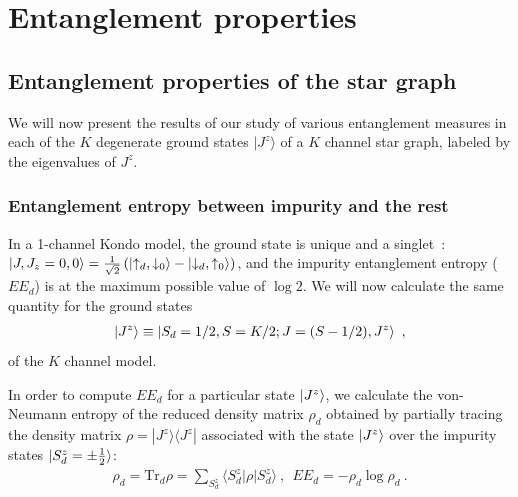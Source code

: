 \documentclass{iopart}
\begin{document}
\section{Entanglement properties}
\label{sec:ent_prop}

\subsection{Entanglement properties of the star graph}
\label{sec:EE_star graph}

We will now present the results of our study of various entanglement measures in each of the $K$ degenerate ground states $|J^z\rangle$ of a $K$ channel star graph, labeled by the eigenvalues of $J^z$.
\subsubsection{Entanglement entropy between impurity and the rest}
In a 1-channel Kondo model, the ground state is unique and a singlet~\cite{wilson1975renormalization}: \(\ket{J,J_z=0,0} = \frac{1}{\sqrt{2}} \left(\ket{\uparrow_{d},\downarrow_0} - \ket{\downarrow_d, \uparrow_0}\right)\), and the impurity entanglement entropy ($EE_d$) is at the  maximum possible value of $\log 2$.
We will now calculate the same quantity for the ground states 
\begin{eqnarray}
\ket{J^z} \equiv \ket{S_d=1/2,S=K/2;J=(S-1/2),J^z}~,
\end{eqnarray}
of the $K$ channel model.

In order to compute \(EE_d\) for a particular state \(\ket{J^z}\), we calculate the von-Neumann entropy of the reduced density matrix \(\rho_d\) obtained by partially tracing the density matrix $\rho=|J^z\rangle\langle J^z|$ associated with the state \(\ket{J^z}\) over the impurity states \(\ket{S_d^z = \pm \frac{1}{2}}\): 
\begin{eqnarray}
\rho_{d}= \textrm{Tr}_{d} \rho=\sum_{S_d^z} \langle S_d^z| \rho | S^z_d\rangle ~,~~EE_d = -\rho_{d} \log \rho_{d}~.
\end{eqnarray}
\end{document}
